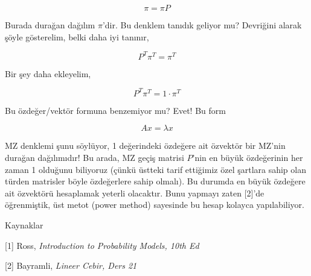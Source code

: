 \documentclass[12pt,fleqn]{article}\usepackage{../../common}
\begin{document}
$$ \pi = \pi P $$

Burada durağan dağılım $\pi$'dir. Bu denklem tanıdık geliyor mu?  Devriğini
alarak şöyle gösterelim, belki daha iyi tanınır, 

$$ P^T\pi^T = \pi^T $$

Bir şey daha ekleyelim, 

$$ P^T\pi^T = 1 \cdot \pi^T $$

Bu özdeğer/vektör formuna benzemiyor mu? Evet! Bu form 

$$ Ax = \lambda x $$

MZ denklemi şunu söylüyor, 1 değerindeki özdeğere ait özvektör bir MZ'nin
durağan dağılımıdır! Bu arada, MZ geçiş matrisi $P$'nin en büyük
özdeğerinin her zaman 1 olduğunu biliyoruz (çünkü üstteki tarif ettiğimiz
özel şartlara sahip olan türden matrisler böyle özdeğerlere sahip
olmalı). Bu durumda en büyük özdeğere ait özvektörü hesaplamak yeterli
olacaktır. Bunu yapmayı zaten [2]'de öğrenmiştik, üst metot (power method)
sayesinde bu hesap kolayca yapılabiliyor.



Kaynaklar

[1] Ross, {\em Introduction to Probability Models, 10th Ed}

[2] Bayramli, {\em Lineer Cebir, Ders 21}
\end{document}

